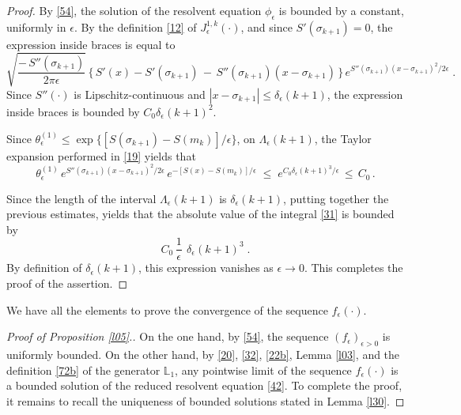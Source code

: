 \documentclass[reqno]{amsart}
\theoremstyle{plain}
\theoremstyle{definition}
\newcommand{\bb}[1]{{\mathbb #1}}
\newcounter{as}[section]
\newcommand{\<}{\langle}
\renewcommand{\>}{\rangle}
\begin{document}
\begin{proof}
By \eqref{54}, the solution of the resolvent equation
$\phi_{\epsilon}$ is bounded by a constant, uniformly in
$\epsilon$. By the definition \eqref{12} of
$J_{\epsilon}^{1,k} (\cdot)$, and since $S'(\sigma_{k+1})=0$,
the expression inside braces is equal
to
\begin{equation*}
\sqrt{\frac{-\, S''(\sigma_{k+1})}{2\pi\epsilon}}
\, \Big\{\, S'(x) - S'(\sigma_{k+1})
\,-\, S''(\sigma_{k+1}) (x-\sigma_{k+1})\,\Big\}\,
e^{S''(\sigma_{k+1}) (x-\sigma_{k+1})^{2}/2 \epsilon }\;.
\end{equation*}
Since $S''(\cdot)$ is Lipschitz-continuous and
$|x-\sigma_{k+1}| \le \delta_\epsilon (k+1)$, the expression inside
braces is bounded by $C_0 \delta_\epsilon (k+1)^2$.

Since $\theta_{\epsilon}^{(1)} \le \exp\{ [S(\sigma_{k+1}) -
S(m_{k})]/\epsilon \}$, on $\Lambda_\epsilon(k+1)$,
the Taylor expansion performed in \eqref{19} yields that
\begin{equation*}
\theta_{\epsilon}^{(1)} \, e^{S''(\sigma_{k+1}) (x-\sigma_{k+1})^{2}/2 \epsilon }\,
e^{-[S(x)-S(m_k)]/\epsilon} 
\;\le\;  e^{C_0 \delta_\epsilon (k+1)^3/\epsilon}\,\le\, C_0\,.
\end{equation*}

Since the length of the interval $\Lambda_\epsilon(k+1)$ is
$\delta_\epsilon (k+1)$, putting together the previous estimates,
yields that the absolute value of the integral \eqref{31} is bounded
by
\begin{equation*}
C_0 \, \frac{1}{\epsilon}\ \, \delta_\epsilon (k+1)^3 \;. 
\end{equation*}
By definition of $\delta_\epsilon (k+1)$, this expression vanishes as
$\epsilon\to 0$.  This completes the proof of the assertion.
\end{proof}

We have all the elements to prove the convergence of the sequence
$f_{\epsilon} (\cdot)$. 

\begin{proof}[Proof of Proposition \ref{l05}.] 

On the one hand, by \eqref{54}, the sequence
$(f_{\epsilon})_{\epsilon>0}$ is uniformly bounded. On the other hand,
by \eqref{20}, \eqref{32}, \eqref{22b}, Lemma \ref{l03}, and the
definition \eqref{72b} of the generator $\bb L_1$, any pointwise limit
of the sequence $f_\epsilon(\cdot)$ is a bounded solution of the
reduced resolvent equation \eqref{42}. To complete the proof, it
remains to recall the uniqueness of bounded solutions stated in Lemma
\ref{l30}.
\end{proof}
\end{document}
